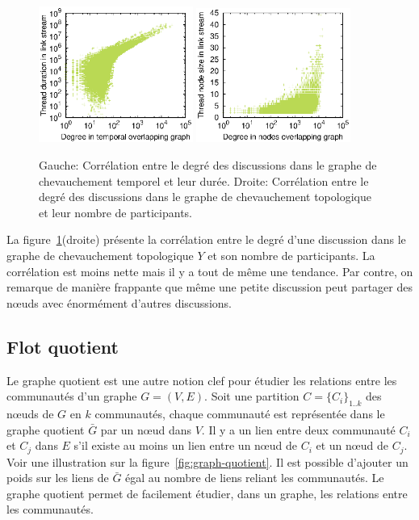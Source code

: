 \begin{figure}
\centering
	\includegraphics[width=0.45\textwidth]{img/mailing/degree_temp}
	\hspace*{0.025\textwidth}
	\includegraphics[width=0.45\textwidth]{img/mailing/degree_nodes}
	\caption{Gauche: Corrélation entre le degré des discussions dans le graphe de chevauchement temporel et leur durée. Droite: Corrélation entre le degré des discussions dans le graphe de chevauchement topologique et leur nombre de participants.}
	\label{fig:x-y-graphs_discu}
\end{figure}

La figure~\ref{fig:x-y-graphs_discu}(droite) présente la corrélation entre le degré d'une discussion dans le graphe de chevauchement topologique $Y$ et son nombre de participants.
La corrélation est moins nette mais il y a tout de même une tendance.
Par contre, on remarque de manière frappante que même une petite discussion peut partager des n\oe uds avec énormément d'autres discussions.


\subsection{Flot quotient}

Le graphe quotient est une autre notion clef pour étudier les relations entre les communautés d'un graphe $G=(V,E)$.
Soit une partition $C= \{C_i\}_{1 .. k}$ des n\oe uds de $G$ en $k$ communautés, chaque communauté est représentée dans le graphe quotient $\bar{G}$ par un n\oe ud dans $V$.
Il y a un lien entre deux communauté $C_i$ et $C_j$ dans $E$ s'il existe au moins un lien entre un n\oe ud de $C_i$ et un n\oe ud de $C_j$.
Voir une illustration sur la figure~\ref{fig:graph-quotient}.
Il est possible d'ajouter un poids sur les liens de $\bar{G}$ égal au nombre de liens reliant les communautés.
Le graphe quotient permet de facilement étudier, dans un graphe, les relations entre les communautés.

